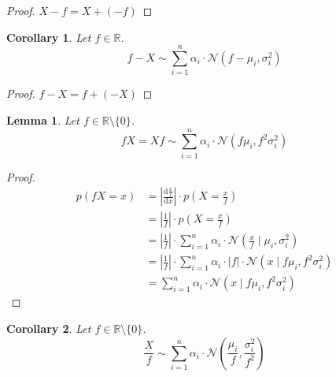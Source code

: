 \documentclass[11pt,a4paper]{book}
\newtheorem{lemma}{Lemma}
\newtheorem{corollary}{Corollary}
\begin{document}
\begin{proof}
  $X - f = X + (-f)$
\end{proof}

\begin{corollary}
  Let $f \in \mathbb{R}$.
  \begin{equation*}
    f - X \sim \sum_{i = 1}^{n} \alpha_{i} \cdot \mathcal{N}(f - \mu_{i}, \sigma_{i}^{2})
  \end{equation*}
\end{corollary}

\begin{proof}
  $f - X = f + (-X)$
\end{proof}

\begin{lemma}
  Let $f \in \mathbb{R} \setminus \{ 0 \}$.
  \begin{equation*}
    fX = Xf \sim \sum_{i = 1}^{n} \alpha_{i} \cdot \mathcal{N}(f\mu_{i}, f^{2}\sigma_{i}^{2})
  \end{equation*}
\end{lemma}

\begin{proof}
  \begin{align*}
    p(fX = x) & = \left| \frac{\mathrm{d}\frac{x}{f}}{\mathrm{d}x} \right| \cdot p\left( X = \frac{x}{f} \right)\\
              & = \left|\frac{1}{f}\right| \cdot p\left( X = \frac{x}{f} \right)\\
              & = \left|\frac{1}{f}\right| \cdot \sum_{i = 1}^{n} \alpha_{i} \cdot \mathcal{N}\left(\frac{x}{f} \mid \mu_{i}, \sigma_{i}^{2}\right)\\
              & = \left|\frac{1}{f}\right| \cdot \sum_{i = 1}^{n} \alpha_{i} \cdot |f| \cdot \mathcal{N}\left(x \mid f\mu_{i}, f^{2}\sigma_{i}^{2}\right)\\
              & = \sum_{i = 1}^{n} \alpha_{i} \cdot \mathcal{N}\left(x \mid f\mu_{i}, f^{2}\sigma_{i}^{2}\right)
  \end{align*}
\end{proof}

\begin{corollary}
  Let $f \in \mathbb{R} \setminus \{ 0 \}$.
  \begin{equation*}
    \frac{X}{f} \sim \sum_{i = 1}^{n} \alpha_{i} \cdot \mathcal{N}\left( \frac{\mu_{i}}{f}, \frac{\sigma_{i}^{2}}{f^{2}} \right)
  \end{equation*}
\end{corollary}
\end{document}
